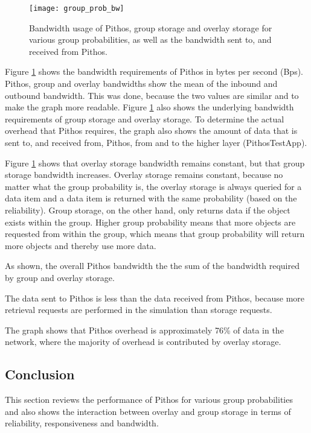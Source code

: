 \begin{figure}[htbp]
 \centering
 \texttt{[image: group\_prob\_bw]}
 \caption{Bandwidth usage of Pithos, group storage and overlay storage for various group probabilities, as well as the bandwidth sent to, and received from Pithos.}
 \label{fig_group_prob_bw}
\end{figure}
%
Figure \ref{fig_group_prob_bw} shows the bandwidth requirements of Pithos in bytes per second (Bps). Pithos, group and overlay bandwidths show the mean of the inbound and outbound bandwidth. This was done, because the two values are similar and to make the graph more readable. Figure \ref{fig_group_prob_bw} also shows the underlying bandwidth requirements of group storage and overlay storage. To determine the actual overhead that Pithos requires, the graph also shows the amount of data that is sent to, and received from, Pithos, from and to the higher layer (PithosTestApp).

Figure \ref{fig_group_prob_bw} shows that overlay storage bandwidth remains constant, but that group storage bandwidth increases. Overlay storage remains constant, because no matter what the group probability is, the overlay storage is always queried for a data item and a data item is returned with the same probability (based on the reliability). Group storage, on the other hand, only returns data if the object exists within the group. Higher group probability means that more objects are requested from within the group, which means that group probability will return more objects and thereby use more data.

As shown, the overall Pithos bandwidth the the sum of the bandwidth required by group and overlay storage.

The data sent to Pithos is less than the data received from Pithos, because more retrieval requests are performed in the simulation than storage requests.

The graph shows that Pithos overhead is approximately 76\% of data in the network, where the majority of overhead is contributed by overlay storage.

\subsection{Conclusion}

This section reviews the performance of Pithos for various group probabilities and also shows the interaction between overlay and group storage in terms of reliability, responsiveness and bandwidth.

